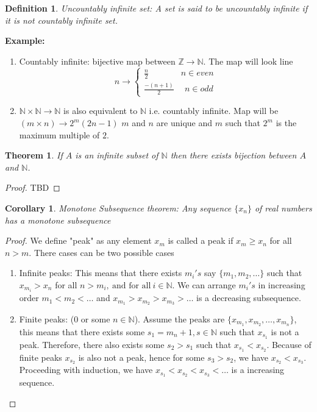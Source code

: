 \documentclass[12pt]{report}
\newtheorem{thm}{Theorem}
\newtheorem{defn}{Definition}
\newtheorem{cor}{Corollary}
\begin{document}
\begin{defn}
    Uncountably infinite set: A set is said to be uncountably infinite if it is not countably infinite set. 
\end{defn}
\textbf{Example:} 
\begin{enumerate}
    \item Countably infinite: bijective map between $\mathbb{Z} \to \mathbb{N}.$ The map will look line
    $$ 
    n\to \begin{cases}
            \frac{n}{2}& n\in even\\
            \frac{-(n+1)}{2}&~~ n \in odd    
         \end{cases}
    $$
    \item $\mathbb{N} \times \mathbb{N} \to \mathbb{N}$ is also equivalent to $\mathbb{N}$ i.e. countably infinite. Map will be $ (m \times n) \to 2^m(2n-1)$ $m$ and $n$ are unique and $m$ such that $2^m$ is the maximum multiple of $2$.
\end{enumerate}
\begin{thm}
    If $A$ is an infinite subset of $\mathbb{N}$ then there exists bijection between $A$ and $\mathbb{N}$.
\end{thm}
\begin{proof}
    TBD
\end{proof}
\begin{cor}
    Monotone Subsequence theorem: Any sequence $\{x_n\}$ of real numbers has a monotone subsequence
\end{cor}
\begin{proof}
    We define "peak" as any element $x_m$ is called a peak if $x_m\geq x_n$ for all $n > m$. There cases can be two possible cases
    \begin{enumerate}
        \item Infinite peaks: This means that there exists $m_i's$ say $\{m_1, m_2, \dots\}$ such that $x_{m_i} > x_n$ for all $n> m_i ,~\text{and for all}~i \in \mathbb{N}$. We can arrange $m_i's$ in increasing order $m_1 < m_2 < \dots$ and $x_{m_1} > x_{m_2} > x_{m_3} > \dots$ is a decreasing subsequence.
        \item Finite peaks: ($0$ or some $n \in \mathbb{N}$). Assume the peaks are $ \{x_{m_1}, x_{m_2} , \dots, x_{m_n}\}$, this means that there exists some $s_1 = m_n+1, s \in \mathbb{N}$ such that $x_{s_1}$ is not a peak. Therefore, there also exists some $s_2 > s_1$ such that $x_{s_1} < x_{s_2}$. Because of finite peaks $x_{s_2}$ is also not a peak, hence for some $s_3 > s_2$, we have $x_{s_2} < x_{s_3}$. Proceeding with induction, we have $x_{s_1} < x_{s_2} < x_{s_3} < \dots$ is a increasing sequence. 
    \end{enumerate}
\end{proof}
\end{document}
